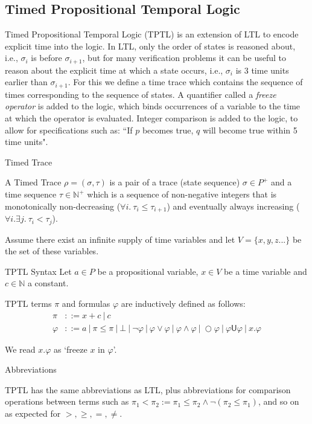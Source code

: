 \documentclass[a4paper]{article}
\newcommand{\U}{\mathsf{U}}
\begin{document}
\subsection{Timed Propositional Temporal Logic}
Timed Propositional Temporal Logic (TPTL)\autocite{alur1994really} is an extension of LTL to encode explicit time into the logic. In LTL, only the order of states is reasoned about, i.e., $\sigma_i$ is before $\sigma_{i+1}$, but for many verification problems it can be useful to reason about the explicit time at which a state occurs, i.e., $\sigma_i$ is 3 time units earlier than $\sigma_{i+1}$. For this we define a time trace which contains the sequence of times corresponding to the sequence of states. A quantifier called a \emph{freeze operator} is added to the logic, which binds occurrences of a variable to the time at which the operator is evaluated. Integer comparison is added to the logic, to allow for specifications such as: ``If $p$ becomes true, $q$ will become true within 5 time units".


\begin{defn}{Timed Trace}

  A Timed Trace $\rho = (\sigma,\tau)$ is a pair of a trace (state sequence) $\sigma \in P^+$ and a time sequence $\tau \in \mathbb{N}^+$ which is a sequence of non-negative integers that is monotonically non-decreasing ($\forall i. ~\tau_i \leq \tau_{i+1}$) and eventually always increasing ($\forall i. \exists j. ~\tau_i < \tau_j$).
\end{defn}

Assume there exist an infinite supply of time variables  and let $V=\{x,y,z...\}$ be the set of these variables.

\begin{defn}{TPTL Syntax}
  Let $a\in P$ be a propositional variable, $x\in V$ be a time variable and $c\in\mathbb{N}$ a constant.

  TPTL terms $\pi$ and formulas $\varphi$ are inductively defined as follows:
  \begin{align*}
    \pi &::= x + c ~|~ c\\
    \varphi &::= a ~|~ \pi \leq \pi ~|~ \bot ~|~ \neg \varphi ~|~\varphi \lor \varphi ~|~ \varphi \land \varphi ~|~ \bigcirc \varphi ~|~ \varphi \U \varphi ~|~ x. \varphi
  \end{align*}
\end{defn}

We read $x. \varphi$ as `freeze $x$ in $\varphi$'.

\begin{notn}{Abbreviations}

  TPTL has the same abbreviations as LTL, plus abbreviations for comparison operations between terms such as $\pi_1 < \pi_2 := \pi_1 \leq \pi_2 \land \neg(\pi_2 \leq \pi_1)$, and so on as expected for $>,\geq,=,\neq$.
\end{notn}
\end{document}
